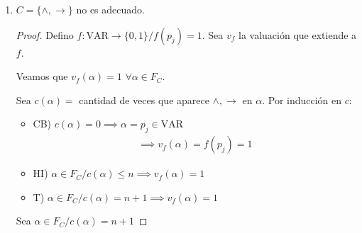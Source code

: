 \begin{enumerate}
\begin{proof}

        \begin{gather*}
            \alpha \leftrightarrow \beta 
            \equiv (\alpha \to \beta) \wedge (\beta \to \alpha)
        \end{gather*}
        \end{proof}

    \item $C = \{ \wedge, \to \}$ no es adecuado. 
        \begin{proof} \phantom{.}
        
            Defino $f: \mathrm{VAR} \to \{ 0,1 \} / f(p_j) = 1$. Sea $v_f$ la 
            valuación que extiende a $f$.

            Veamos que $v_f(\alpha) = 1$ $\forall \alpha \in F_C$.

            Sea $c(\alpha) = $ cantidad de veces que aparece $\wedge, \to$ en
            $\alpha$. Por inducción en $c$:

            \begin{itemize}
                \item CB) 
                    $c(\alpha) = 0 \implies \alpha = p_j \in \mathrm{VAR}$
                    \begin{gather*}
                        \implies v_f(\alpha) = f(p_j) = 1
                    \end{gather*} 

                \item HI) $\alpha \in F_C / c(\alpha) \leq n 
                    \implies v_f(\alpha)=1$

                \item T) $\alpha \in F_C / c(\alpha) = n+1 
                    \implies v_f(\alpha) = 1$
            \end{itemize}

            Sea $\alpha \in F_C/ c(\alpha) = n + 1$


\end{proof}
\end{enumerate}
